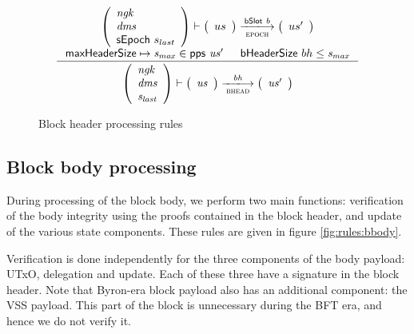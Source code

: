\documentclass[11pt,a4paper]{article}
\newcommand{\var}[1]{\mathit{#1}}
\newcommand{\fun}[1]{\mathsf{#1}}
\newcommand{\trans}[2]{\xlongrightarrow[\textsc{#1}]{#2}}
\newcommand{\bhdrsizename}{bHeaderSize}
\newcommand{\bhdrsize}[1]{\fun{\bhdrsizename} ~ #1}
\begin{document}
\begin{figure}[ht]
  \begin{equation*}
    \inference
    {
      {\left(
        \begin{array}{l}
          \var{ngk}\\
          \var{dms}\\
          \sepoch{s_{last}}\\
        \end{array}
      \right)}
      \vdash
      {\left(
          \begin{array}{l}
            us
          \end{array}
        \right)}
      \trans{epoch}{\bslot{b}}
      {\left(
          \begin{array}{l}
            us'
          \end{array}
        \right)}
      \\
      \\ \maxheadersize \mapsto \var{s_{max}} \in \fun{pps}~\var{us'} & \bhdrsize{bh} \leq \var{s_{max}}
    }
    {
      {\left(
        \begin{array}{l}
          \var{ngk}\\
          \var{dms}\\
          \var{s_{last}}
        \end{array}
        \right)}
      \vdash
      \left(
        {\begin{array}{c}
           \var{us}
         \end{array}}
     \right)
     \trans{bhead}{\var{bh}}
     \left(
       {\begin{array}{c}
          \var{us'}
        \end{array}}
    \right)
  }
\end{equation*}
\caption{Block header processing rules}
\label{fig:rules:bhead}
\end{figure}

\clearpage

\subsection{Block body processing}

During processing of the block body, we perform two main functions: verification
of the body integrity using the proofs contained in the block header, and update
of the various state components. These rules are given in figure
\ref{fig:rules:bbody}.

Verification is done independently for the three components of the body payload:
UTxO, delegation and update. Each of these three have a signature in the block
header. Note that Byron-era block payload also has an additional component: the
VSS payload. This part of the block is unnecessary during the BFT era, and hence
we do not verify it.
\end{document}
